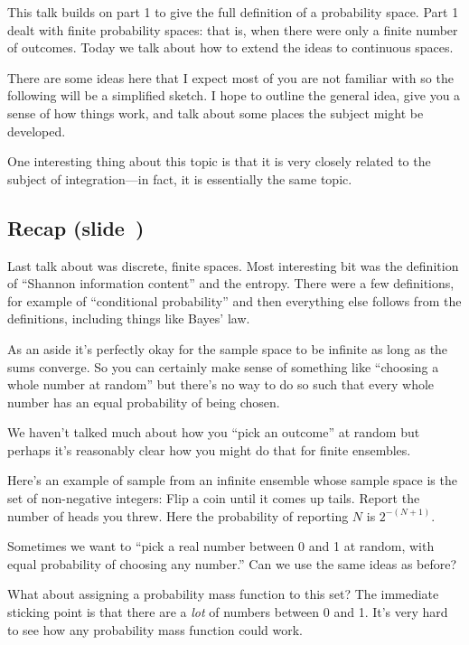 \documentclass[11pt]{article}
\begin{document}
This talk builds on part 1 to give the full definition of a probability
space. Part 1 dealt with finite probability spaces: that is, when there were
only a finite number of outcomes. Today we talk about how to extend the ideas to
continuous spaces.

There are some ideas here that I expect most of you are not familiar with so the
following will be a simplified sketch. I hope to outline the general idea, give
you a sense of how things work, and talk about some places the subject might be
developed.

One interesting thing about this topic is that it is very closely related to the
subject of integration---in fact, it is essentially the same topic. 

\newpage
\subsection*{Recap (slide~\pageref{slide:recap})}

Last talk about was discrete, finite spaces. Most interesting bit was the
definition of “Shannon information content” and the entropy. There were a few
definitions, for example of “conditional probability” and then everything else
follows from the definitions, including things like Bayes' law.

As an aside it's perfectly okay for the sample space to be infinite as long as
the sums converge. So you can certainly make sense of something like “choosing a
whole number at random” but there's no way to do so such that every whole number
has an equal probability of being chosen.

We haven't talked much about how you “pick an outcome” at random but perhaps
it's reasonably clear how you might do that for finite ensembles.

Here's an example of sample from an infinite ensemble whose sample space is the
set of non-negative integers: Flip a coin until it comes up tails. Report the
number of heads you threw. Here the probability of reporting $N$ is $2^{-(N+1)}$.  

Sometimes we want to “pick a real number between 0 and 1 at random, with equal
probability of choosing any number.” Can we use the same ideas as before?

What about assigning a probability mass function to this set? The immediate
sticking point is that there are a \emph{lot} of numbers between 0 and 1. It's
very hard to see how any probability mass function could work.
\end{document}
